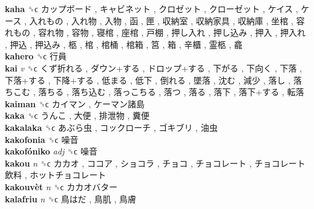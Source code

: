 \textbf{kaha} ␝ϲ   カップボード ,  キャビネット ,  クロゼット ,  クローゼット ,  ケイス ,  ケース ,  入れもの ,  入れ物 ,  入物 ,  函 ,  匣 ,  収納室 ,  収納家具 ,  収納庫 ,  坐棺 ,  容れもの ,  容れ物 ,  容物 ,  寝棺 ,  座棺 ,  戸棚 ,  押し入れ ,  押し込み ,  押入 ,  押入れ ,  押込 ,  押込み ,  柩 ,  棺 ,  棺桶 ,  棺箱 ,  筥 ,  箱 ,  辛櫃 ,  霊柩 ,  龕   \\
\textbf{kahero} ␝ϲ   行員   \\
\textbf{kai} \emph{v}  ␝ϲ   くず折れる ,  ダウン+する ,  ドロップ+する ,  下がる ,  下向く ,  下落 ,  下落+する ,  下降+する ,  低まる ,  低下 ,  倒れる ,  墜落 ,  沈む ,  減少 ,  落し ,  落ちこむ ,  落ちる ,  落ち込む ,  落っこちる ,  落つ ,  落る ,  落下 ,  落下+する ,  転落   \\
\textbf{kaiman} ␝ϲ   カイマン ,  ケーマン諸島   \\
\textbf{kaka} ␝ϲ   うんこ ,  大便 ,  排泄物 ,  糞便   \\
\textbf{kakalaka} ␝ϲ   あぶら虫 ,  コックローチ ,  ゴキブリ ,  油虫   \\
\textbf{kakofonia} ␝ϲ   噪音   \\
\textbf{kakofóniko} \emph{adj}  ␝ϲ   噪音   \\
\textbf{kakou} \emph{n}  ␝ϲ   カカオ ,  ココア ,  ショコラ ,  チョコ ,  チョコレート ,  チョコレート飲料 ,  ホットチョコレート   \\
\textbf{kakouvèt} \emph{n}  ␝ϲ   カカオバター   \\
\textbf{kalafriu} \emph{n}  ␝ϲ   鳥はだ ,  鳥肌 ,  鳥膚   \\
